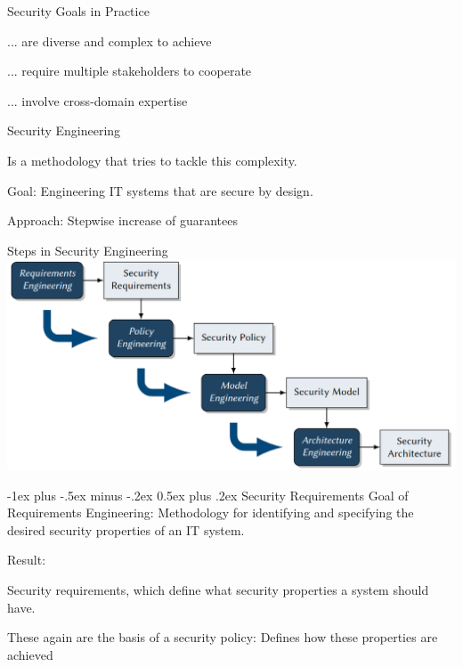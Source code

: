 \documentclass[a4paper]{article}
\makeatletter
\renewcommand{\section}{\@startsection{section}{1}{0mm}%
                                {-1ex plus -.5ex minus -.2ex}%
                                {0.5ex plus .2ex}%
                                {\normalfont\large\bfseries}}
\makeatother
\begin{document}
\begin{multicols}{3}
    Security Goals in Practice
    \begin{itemize*}
        \item ... are diverse and complex to achieve
        \item ... require multiple stakeholders to cooperate
        \item ... involve cross-domain expertise
    \end{itemize*}

    Security Engineering
    \begin{itemize*}
        \item Is a methodology that tries to tackle this complexity.
        \item Goal: Engineering IT systems that are secure by design.
        \item Approach: Stepwise increase of guarantees
    \end{itemize*}

    Steps in Security Engineering
    \includegraphics[width=\linewidth]{Assets/Systemsicherheit-engineering-process.png}

    \section{Security Requirements}
    Goal of Requirements Engineering:
    Methodology for identifying and specifying the desired security properties of an IT system.

    Result:
    \begin{itemize*}
        \item Security requirements, which define what security properties a system should have.
        \item These again are the basis of a security policy: Defines how these properties are achieved
    \end{itemize*}


\end{multicols}
\end{document}
